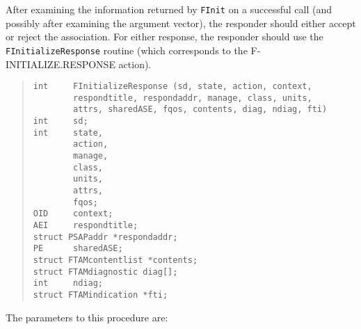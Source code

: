 After examining the information returned by \verb"FInit" on a successful call
(and possibly after examining the argument vector),
the responder should either accept or reject the association.
For either response,
the responder should use the \verb"FInitializeResponse" routine
(which corresponds to the {\sf F-INITIALIZE.RESPONSE\/} action).
\begin{quote}\small\begin{verbatim}
int     FInitializeResponse (sd, state, action, context,
        respondtitle, respondaddr, manage, class, units,
        attrs, sharedASE, fqos, contents, diag, ndiag, fti)
int     sd;
int     state,
        action,
        manage,
        class,
        units,
        attrs,
        fqos;
OID     context;
AEI     respondtitle;
struct PSAPaddr *respondaddr;
PE      sharedASE;
struct FTAMcontentlist *contents;
struct FTAMdiagnostic diag[];
int     ndiag;
struct FTAMindication *fti;
\end{verbatim}\end{quote}
The parameters to this procedure are:
